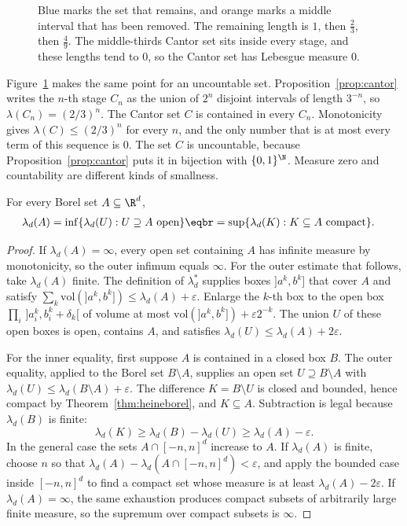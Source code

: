 \begin{figure}[ht]
\centering
{}
\caption{Blue marks the set that remains, and orange marks a middle interval that has been removed.
The remaining length is $1$, then $\frac23$, then $\frac49$.
The middle-thirds Cantor set sits inside every stage, and these lengths tend to $0$, so the Cantor set has Lebesgue measure $0$.}
\label{fig:rwcantor}
\end{figure}

Figure~\ref{fig:rwcantor} makes the same point for an uncountable set.
Proposition~\ref{prop:cantor} writes the $n$-th stage $C_n$ as the union of $2^n$ disjoint intervals of length $3^{-n}$, so $\lambda(C_n)=(2/3)^n$.
The Cantor set $C$ is contained in every $C_n$.
Monotonicity gives $\lambda(C)\le(2/3)^n$ for every $n$, and the only number that is at most every term of this sequence is $0$.
The set $C$ is uncountable, because Proposition~\ref{prop:cantor} puts it in bijection with $\{0,1\}^\N$.
Measure zero and countability are different kinds of smallness.

\begin{proposition}[regularity]\label{prop:regularity}
For every Borel set $A\subseteq\R^d$,
\[\begin{aligned}\lambda_d(A)&=\inf\{\lambda_d(U):U\supseteq A\text{ open}\}\eqbr=\sup\{\lambda_d(K):K\subseteq A\text{ compact}\}.\end{aligned}\]
\end{proposition}
\begin{proof}
If $\lambda_d(A)=\infty$, every open set containing $A$ has infinite measure by monotonicity, so the outer infimum equals $\infty$.
For the outer estimate that follows, take $\lambda_d(A)$ finite.
The definition of $\lambda_d^*$ supplies boxes $]a^k,b^k]$ that cover $A$ and satisfy $\sum_k\mathrm{vol}(]a^k,b^k])\le\lambda_d(A)+\varepsilon$.
Enlarge the $k$-th box to the open box $\prod_i\,]a^k_i,b^k_i+\delta_k[$ of volume at most $\mathrm{vol}(]a^k,b^k])+\varepsilon 2^{-k}$.
The union $U$ of these open boxes is open, contains $A$, and satisfies $\lambda_d(U)\le\lambda_d(A)+2\varepsilon$.

For the inner equality, first suppose $A$ is contained in a closed box $B$.
The outer equality, applied to the Borel set $B\setminus A$, supplies an open set $U\supseteq B\setminus A$ with $\lambda_d(U)\le\lambda_d(B\setminus A)+\varepsilon$.
The difference $K=B\setminus U$ is closed and bounded, hence compact by Theorem~\ref{thm:heineborel}, and $K\subseteq A$.
Subtraction is legal because $\lambda_d(B)$ is finite:
\[
\lambda_d(K)\ge\lambda_d(B)-\lambda_d(U)\ge\lambda_d(A)-\varepsilon.
\]
In the general case the sets $A\cap[-n,n]^d$ increase to $A$.
If $\lambda_d(A)$ is finite, choose $n$ so that $\lambda_d(A)-\lambda_d(A\cap[-n,n]^d)<\varepsilon$, and apply the bounded case inside $[-n,n]^d$ to find a compact set whose measure is at least $\lambda_d(A)-2\varepsilon$.
If $\lambda_d(A)=\infty$, the same exhaustion produces compact subsets of arbitrarily large finite measure, so the supremum over compact subsets is $\infty$.
\end{proof}

